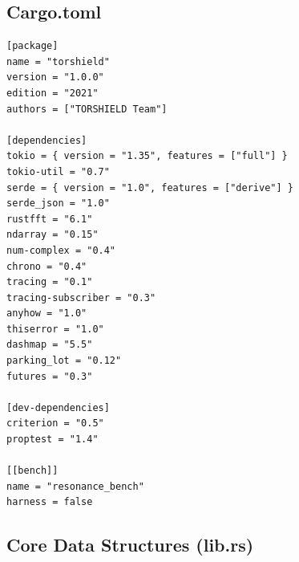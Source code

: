 \documentclass[11pt,a4paper]{article}
\begin{document}
\subsection{Cargo.toml}

\begin{lstlisting}[style=rust]
[package]
name = "torshield"
version = "1.0.0"
edition = "2021"
authors = ["TORSHIELD Team"]

[dependencies]
tokio = { version = "1.35", features = ["full"] }
tokio-util = "0.7"
serde = { version = "1.0", features = ["derive"] }
serde_json = "1.0"
rustfft = "6.1"
ndarray = "0.15"
num-complex = "0.4"
chrono = "0.4"
tracing = "0.1"
tracing-subscriber = "0.3"
anyhow = "1.0"
thiserror = "1.0"
dashmap = "5.5"
parking_lot = "0.12"
futures = "0.3"

[dev-dependencies]
criterion = "0.5"
proptest = "1.4"

[[bench]]
name = "resonance_bench"
harness = false
\end{lstlisting}

\subsection{Core Data Structures (lib.rs)}
\end{document}
